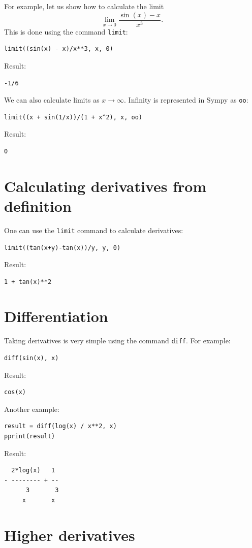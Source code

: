 \documentclass{article}
\begin{document}
\noindent
For example, let us show how to calculate the limit
$$
\lim_{x \rightarrow 0} \frac{\sin(x) - x}{x^3}.
$$
This is done using the command {\tt limit}:
\begin{verbatim}
limit((sin(x) - x)/x**3, x, 0)
\end{verbatim}
Result:
\begin{verbatim}
-1/6
\end{verbatim}
We can also calculate limits as $x \rightarrow \infty$. Infinity is represented 
in Sympy as {\tt oo}:
\begin{verbatim}
limit((x + sin(1/x))/(1 + x^2), x, oo)
\end{verbatim}
Result:
\begin{verbatim}
0
\end{verbatim}

\section{Calculating derivatives from definition}

One can use the {\tt limit} command to calculate derivatives:
\begin{verbatim}
limit((tan(x+y)-tan(x))/y, y, 0)
\end{verbatim}
Result:
\begin{verbatim}
1 + tan(x)**2
\end{verbatim}

\section{Differentiation}

Taking derivatives is very simple using the command {\tt diff}. For example:
\begin{verbatim}
diff(sin(x), x)
\end{verbatim}
Result:
\begin{verbatim}
cos(x)
\end{verbatim}
Another example:
\begin{verbatim}
result = diff(log(x) / x**2, x)
pprint(result)
\end{verbatim}
Result:
\begin{verbatim}
  2*log(x)   1 
- -------- + --
      3       3
     x       x 
\end{verbatim}

\section{Higher derivatives}
\end{document}
